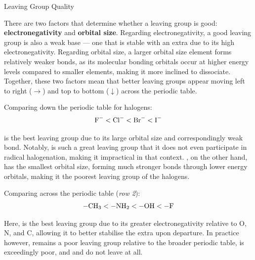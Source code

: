 \documentclass[10pt]{article}
\begin{document}
  \begin{core}{Leaving Group Quality}

    There are two factors that determine whether a leaving group is good: \textbf{electronegativity} and \textbf{orbital size}. Regarding electronegativity, a good leaving group is also a weak base  --- one that is stable with an extra  due to its high electronegativity. Regarding orbital size, a larger orbital size element forms relatively weaker bonds, as its molecular bonding orbitals occur at higher energy levels compared to smaller elements, making it more inclined to dissociate. Together, these two factors mean that better leaving groups appear moving left to right ($\rightarrow$) and top to bottom ($\downarrow$) across the periodic table.


    Comparing down the periodic table for halogens:
    \[
      \ce{F-} < \ce{Cl-} < \ce{Br-} < \ce{I-}
    \]

     is the best leaving group due to its large orbital size and correspondingly weak bond. Notably,  is such a great leaving group that it does not even participate in radical halogenation, making it impractical in that context. , on the other hand, has the smallest orbital size, forming much stronger bonds through lower energy orbitals, making it the poorest leaving group of the halogens.

    Comparing across the periodic table (\textit{row 2}):
    \[
      \ce{-CH3} < \ce{-NH2} < \ce{-OH} < \ce{-F}
    \]

    Here,  is the best leaving group due to its greater electronegativity relative to O, N, and C, allowing it to better stabilise the extra  upon departure. In practice however,  remains a poor leaving group relative to the broader periodic table,  is exceedingly poor, and  and  do not leave at all.


\end{core}
\end{document}
